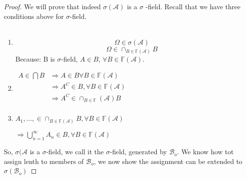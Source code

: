 \documentclass[11pt,fleqn]{book} %
\begin{document}
\begin{proof} We will prove that indeed $\sigma(\mathcal{A})$ is a $\sigma$ -field. Recall that we have three conditions above for $\sigma$-field.\\
\\
	\begin{enumerate}[label = (\roman*)]
		\item $$\Omega \in \sigma(\mathcal{A})$$ 
			$$\Omega \in \cap_{B \in \mathbb{F}(\mathcal{A})} B $$
			Because: B is $\sigma$-field, $A \in B$, $\forall B \in \mathbb{F}(\mathcal{A})$.
		\item 
			$\begin{aligned}
							A \in \bigcap  B &\Rightarrow A \in B \forall B \in\mathbb{F}(\mathcal{A})\\
							&\Rightarrow A^C \in B , \forall B  \in \mathbb{F}(\mathcal{A})\\ 
							&\Rightarrow A^C \in \cap_{B \in \mathbb{F}}(\mathcal{A}) B\\
						\end{aligned}$

		\item $A_1, \dots, \in \cap_{B \in \mathbb{F}(\mathcal{A})} B, \forall  B  \in \mathbb{F}(\mathcal{A})$

		$\Rightarrow \bigcup^\infty_{n =1} A_n \in B, \forall B \in \mathbb{F}(\mathcal{A})$

	\end{enumerate}

	So, $\sigma(\mathcal{A}$ is a $\sigma$-field, we call it the $\sigma$-field, generated by $\mathcal{B}_o$. We know how tot assign lenth to members of $\mathcal{B}_o$, we now show the assignment can be extended to $\sigma(\mathcal{B}_o)$ 


\end{proof}
\end{document}
